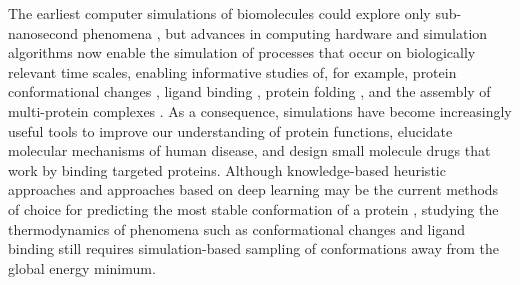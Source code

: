 \documentclass[9pt,review,pubversion]{livecoms}
\begin{document}
The earliest computer simulations of biomolecules could explore only sub-nanosecond phenomena \cite{mccammon_dynamics_1977,case_dynamics_1979,levitt_accurate_1988}, but advances in computing hardware \cite{stone_accelerating_2007,shaw_anton_2008} and simulation algorithms \cite{darden_particle_1993,wennberg_direct-space_2015} now enable the simulation of processes that occur on biologically relevant time scales, enabling informative studies of, for example, protein conformational changes \cite{grant_large_2010,anandakrishnan_speed_2015}, ligand binding \cite{gilson_calculation_2007,wang_identifying_2013,reif_net_2014}, protein folding \cite{lindorff-larsen_how_2011,shaw_atomic-level_2010}, and the assembly of multi-protein complexes \cite{ssaglam_proteinprotein_2019}.
As a consequence, simulations have become increasingly useful tools to improve our understanding of protein functions, elucidate molecular mechanisms of human disease, and design small molecule drugs that work by binding targeted proteins.
Although knowledge-based heuristic approaches \cite{rohl_protein_2004} and approaches based on deep learning \cite{jumper_highly_2021} may be the current methods of choice for predicting the most stable conformation of a protein \cite{kryshtafovych_critical_2021}, studying the thermodynamics of phenomena such as conformational changes and ligand binding still requires simulation-based sampling of conformations away from the global energy minimum.
\end{document}
